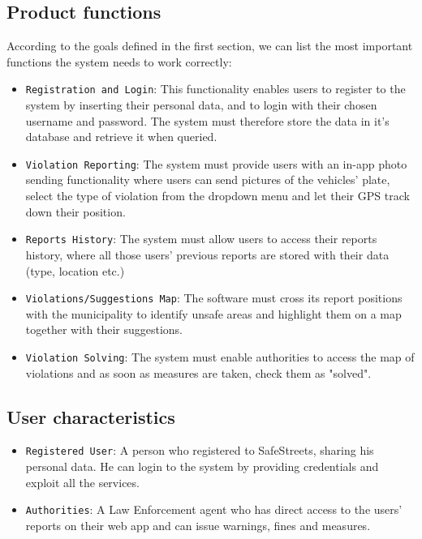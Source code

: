 \documentclass[12pt,a4paper]{article}
\begin{document}
\subsection{Product functions} 
According to the goals defined in the first section, we can list the most important functions the system needs to work correctly:
\begin{itemize}
\item {\texttt{Registration and Login}}: This functionality enables users to register to the system by inserting their personal data, and to login with their chosen username and password. The system must therefore store the data in it's database and retrieve it when queried.  
\item {\texttt{Violation Reporting}}: The system must provide users with an in-app photo sending functionality where users can send pictures of the vehicles' plate, select the type of violation from the dropdown menu and let their GPS track down their position.
\item {\texttt{Reports History}}: The system must allow users to access their reports history, where all those users' previous reports are stored with their data (type, location etc.)
\item {\texttt{Violations/Suggestions Map}}: The software must cross its report positions with the municipality to identify unsafe areas and highlight them on a map together with their suggestions.
\item {\texttt{Violation Solving}}: The system must enable authorities to access the map of violations and as soon as measures are taken, check them as "solved".
\end{itemize}

\newpage

\subsection{User characteristics} 
\begin{itemize}
\item {\texttt{Registered User}}: A person who registered to SafeStreets, sharing his personal data. He can login to the system by providing credentials and exploit all the services.
\item {\texttt{Authorities}}: A Law Enforcement agent who has direct access to the users' reports on their web app and can issue warnings, fines and measures.
\end{itemize}
\end{document}
